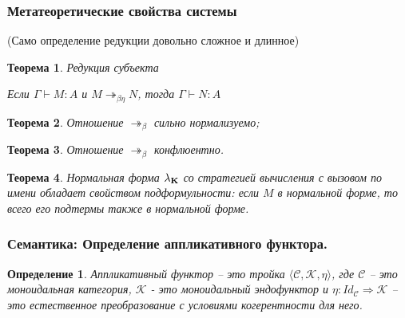 \documentclass[10pt,pdf,utf8,russian,aspectratio=169]{beamer}
\newtheorem{defin}{Определение}
\newtheorem{theor}{Теорема}
\begin{document}
\begin{frame}
  \frametitle{Метатеоретические свойства системы}

(Само определение редукции довольно сложное и длинное)

  \begin{theor} Редукция субъекта

  Если $\Gamma \vdash M : A$ и $M \twoheadrightarrow_{\beta \eta} N$, тогда $\Gamma \vdash N : A$

  \end{theor}

  \begin{theor}
  Отношение $\twoheadrightarrow_{\beta}$ сильно нормализуемо;
  \end{theor}

  \begin{theor}
  Отношение $\twoheadrightarrow_{\beta}$ конфлюентно.
  \end{theor}

  \begin{theor}
  Нормальная форма $\lambda_{{\bf K}}$ со стратегией вычисления с вызовом по имени обладает свойством подформульности:
если $M$ в нормальной форме, то всего его подтермы также в нормальной форме.

  \end{theor}
\end{frame}

\begin{frame}
  \frametitle{Семантика: Определение аппликативного функтора.}

  \begin{defin}
    Аппликативный функтор -- это тройка $\langle \mathcal{C}, \mathcal{K}, \eta \rangle$,
  где $\mathcal{C}$ -- это моноидальная категория, $\mathcal{K}$ - это моноидальный эндофунктор и
  $\eta : Id_{\mathcal{C}} \Rightarrow \mathcal{K}$ -- это естественное преобразование с условиями когерентности для него.
  \end{defin}
\end{frame}
\end{document}
